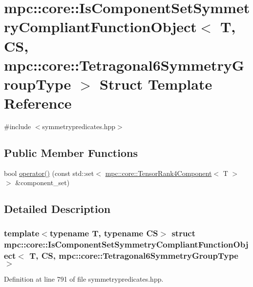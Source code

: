 \hypertarget{structmpc_1_1core_1_1_is_component_set_symmetry_compliant_function_object_3_01_t_00_01_c_s_00_01d026bbfe93e923dfb312d1f5251cf8bf}{}\section{mpc\+:\+:core\+:\+:Is\+Component\+Set\+Symmetry\+Compliant\+Function\+Object$<$ T, CS, mpc\+:\+:core\+:\+:Tetragonal6\+Symmetry\+Group\+Type $>$ Struct Template Reference}
\label{structmpc_1_1core_1_1_is_component_set_symmetry_compliant_function_object_3_01_t_00_01_c_s_00_01d026bbfe93e923dfb312d1f5251cf8bf}


{\ttfamily \#include $<$symmetrypredicates.\+hpp$>$}

\subsection*{Public Member Functions}
\begin{DoxyCompactItemize}
\item 
bool \mbox{\hyperlink{structmpc_1_1core_1_1_is_component_set_symmetry_compliant_function_object_3_01_t_00_01_c_s_00_01d026bbfe93e923dfb312d1f5251cf8bf_a8438f1a4ac1636b5c1ee7310bf6b8497}{operator()}} (const std\+::set$<$ \mbox{\hyperlink{namespacempc_1_1core_ac3a232afc7c680d580628e834030482f}{mpc\+::core\+::\+Tensor\+Rank4\+Component}}$<$ T $>$ $>$ \&component\+\_\+set)
\end{DoxyCompactItemize}


\subsection{Detailed Description}
\subsubsection*{template$<$typename T, typename CS$>$\newline
struct mpc\+::core\+::\+Is\+Component\+Set\+Symmetry\+Compliant\+Function\+Object$<$ T, C\+S, mpc\+::core\+::\+Tetragonal6\+Symmetry\+Group\+Type $>$}



Definition at line 791 of file symmetrypredicates.\+hpp.



